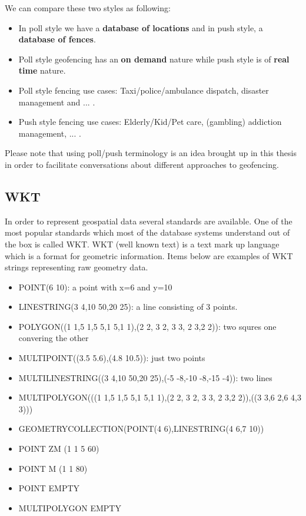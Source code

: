 \documentclass[a4]{report}
\begin{document}
        We can compare these two styles as following:
        \begin{itemize}
            \item In poll style we have a \textbf{database of locations} and in push style, a \textbf{database of fences}.
            \item Poll style geofencing has an \textbf{on demand} nature while push style is of \textbf{real time} nature.
            \item Poll style fencing use cases: Taxi/police/ambulance dispatch, disaster management and ... .
            \item Push style fencing use cases: Elderly/Kid/Pet care, (gambling) addiction management, ... .
        \end{itemize}

        Please note that using poll/push terminology is an idea brought up in this thesis in order to facilitate
        conversations about different approaches to geofencing.

        \subsection{WKT \cite{WKT}}
        In order to represent geospatial data several standards are available.
        One of the most popular standards which most of the database systems understand out of the box is called WKT.
        WKT (well known text) is a text mark up language which is a format for geometric information.
        Items below are examples of WKT strings representing raw geometry data.
        \begin{itemize}
            \item POINT(6 10): a point with x=6 and y=10
            \item LINESTRING(3 4,10 50,20 25): a line consisting of 3 points.
            \item POLYGON((1 1,5 1,5 5,1 5,1 1),(2 2, 3 2, 3 3, 2 3,2 2)): two squres one convering the other
            \item MULTIPOINT((3.5 5.6),(4.8 10.5)): just two points
            \item MULTILINESTRING((3 4,10 50,20 25),(-5 -8,-10 -8,-15 -4)): two lines
            \item MULTIPOLYGON(((1 1,5 1,5 5,1 5,1 1),(2 2, 3 2, 3 3, 2 3,2 2)),((3 3,6 2,6 4,3 3)))
            \item GEOMETRYCOLLECTION(POINT(4 6),LINESTRING(4 6,7 10))
            \item POINT ZM (1 1 5 60)
            \item POINT M (1 1 80)
            \item POINT EMPTY
            \item MULTIPOLYGON EMPTY
        \end{itemize}
\end{document}
